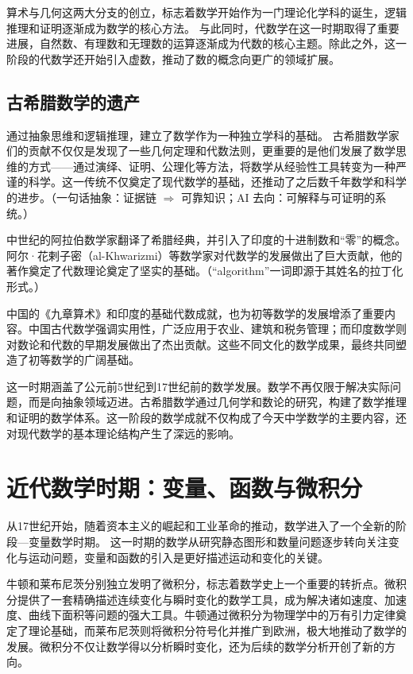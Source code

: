 算术与几何这两大分支的创立，标志着数学开始作为一门理论化学科的诞生，逻辑推理和证明逐渐成为数学的核心方法。
与此同时，代数学在这一时期取得了重要进展，自然数、有理数和无理数的运算逐渐成为代数的核心主题。除此之外，这一阶段的代数学还开始引入虚数，推动了数的概念向更广的领域扩展。

\subsection{古希腊数学的遗产}
通过抽象思维和逻辑推理，建立了数学作为一种独立学科的基础。
古希腊数学家们的贡献不仅仅是发现了一些几何定理和代数法则，更重要的是他们发展了数学思维的方式——通过演绎、证明、公理化等方法，将数学从经验性工具转变为一种严谨的科学。这一传统不仅奠定了现代数学的基础，还推动了之后数千年数学和科学的进步。{（一句话抽象：证据链 $\Rightarrow$ 可靠知识；AI 去向：可解释与可证明的系统。）}

中世纪的阿拉伯数学家翻译了希腊经典，并引入了印度的十进制数和“零”的概念。阿尔·花剌子密（al-Khwarizmi）等数学家对代数学的发展做出了巨大贡献，他的著作奠定了代数理论奠定了坚实的基础。{（“algorithm”一词即源于其姓名的拉丁化形式。）}

中国的《九章算术》和印度的基础代数成就，也为初等数学的发展增添了重要内容。中国古代数学强调实用性，广泛应用于农业、建筑和税务管理；而印度数学则对数论和代数的早期发展做出了杰出贡献。这些不同文化的数学成果，最终共同塑造了初等数学的广阔基础。

这一时期涵盖了公元前5世纪到17世纪前的数学发展。数学不再仅限于解决实际问题，而是向抽象领域迈进。古希腊数学通过几何学和数论的研究，构建了数学推理和证明的数学体系。这一阶段的数学成就不仅构成了今天中学数学的主要内容，还对现代数学的基本理论结构产生了深远的影响。

\section{近代数学时期：变量、函数与微积分}
从17世纪开始，随着资本主义的崛起和工业革命的推动，数学进入了一个全新的阶段---变量数学时期。
这一时期的数学从研究静态图形和数量问题逐步转向关注变化与运动问题，变量和函数的引入是更好描述运动和变化的关键。

牛顿和莱布尼茨分别独立发明了微积分，标志着数学史上一个重要的转折点。微积分提供了一套精确描述连续变化与瞬时变化的数学工具，成为解决诸如速度、加速度、曲线下面积等问题的强大工具。牛顿通过微积分为物理学中的万有引力定律奠定了理论基础，而莱布尼茨则将微积分符号化并推广到欧洲，极大地推动了数学的发展。微积分不仅让数学得以分析瞬时变化，还为后续的数学分析开创了新的方向。

